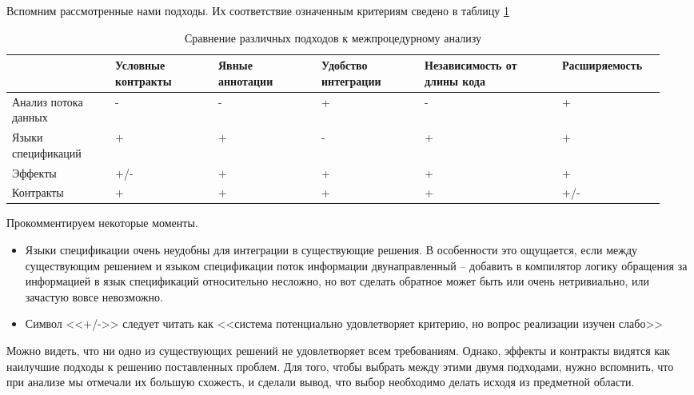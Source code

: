 Вспомним рассмотренные нами подходы. Их соответствие означенным критериям сведено в таблицу \ref{approaches-analysis}

\begin{table}
\begin{tabular}{ | p{0.15\linewidth} | p{0.15\linewidth} | p{0.15\linewidth} | p{0.15\linewidth} | p{0.20\linewidth} | p{0.15\linewidth} | }
	\hline
					     & Условные контракты & Явные аннотации            & Удобство интеграции & Независимость от длины кода & Расширяемость \\\hline
	
	Анализ потока данных & 	-				  & -						   & +					 & -						   & + 			   \\\hline
	
	Языки спецификаций   & +				  & +						   & -					 & +						   & +			   \\\hline
	
	Эффекты			     & +/- 				  & +						   & +					 & +						   & +   		   \\\hline
	
	Контракты		     & + 				  & +						   & +					 & +						   & +/-			   \\\hline
\end{tabular}
\label{approaches-analysis}
\caption{Сравнение различных подходов к межпроцедурному анализу}
\end{table}

Прокомментируем некоторые моменты. 

\begin{itemize}
	\item Языки спецификации очень неудобны для интеграции в существующие решения. В особенности это ощущается, если между существующим решением и языком спецификации поток информации двунаправленный -- добавить в компилятор логику обращения за информацией в язык спецификаций относительно несложно, но вот сделать обратное может быть или очень нетривиально, или зачастую вовсе невозможно. 
	
	\item Символ <<+/->> следует читать как <<система потенциально удовлетворяет критерию, но вопрос реализации изучен слабо>>
\end{itemize}

Можно видеть, что ни одно из существующих решений не удовлетворяет всем требованиям. Однако, эффекты и контракты видятся как наилучшие подходы к решению поставленных проблем. Для того, чтобы выбрать между этими двумя подходами, нужно вспомнить, что при анализе мы отмечали их большую схожесть, и сделали вывод, что выбор необходимо делать исходя из предметной области. 

